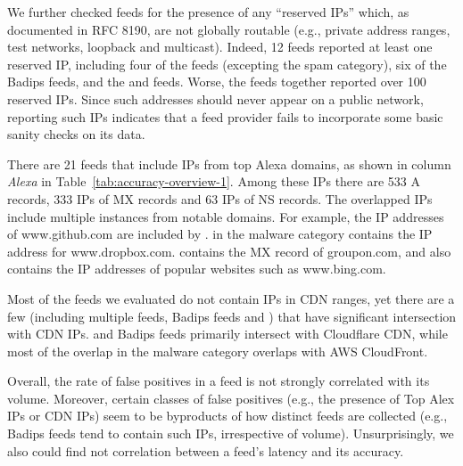 We further checked feeds for the presence of any ``reserved IPs''
which, as documented in RFC 8190, are not globally routable (e.g., private
address ranges, test networks, loopback and multicast).  Indeed,
12 feeds reported at least one reserved IP, including four of the
{\feedetiprep} feeds (excepting the spam category), six of the Badips
feeds, and the {\feedFBAdmin} and {\feeddshield} feeds. Worse, the
{\feedetiprep} feeds together reported over 100 reserved IPs. Since
such addresses should never appear on a public network,
reporting such IPs indicates that a feed provider fails to
incorporate some basic sanity checks on its data.

There are 21 feeds that include IPs from top Alexa domains, as shown
in column \textit{Alexa} in Table~\ref{tab:accuracy-overview-1}. Among
these IPs there are 533 A records, 333 IPs of MX records and 63 IPs of
NS records.  The overlapped IPs include multiple instances from
notable domains. For example, the IP addresses of www.github.com are
included by {\feedmalcode}.  {\feedetiprep} in the malware category
contains the IP address for www.dropbox.com.  {\feedalienvault}
contains the MX record of groupon.com, and {\feedbadipssh} also
contains the IP addresses of popular websites such as www.bing.com.

Most of the feeds we evaluated do not contain IPs in CDN ranges, yet
there are a few (including multiple {\feedetiprep} feeds, Badips feeds
and {\feedalienvault}) that have significant intersection with CDN
IPs. {\feedalienvault} and Badips feeds primarily intersect with
Cloudflare CDN, while most of the overlap in the {\feedetiprep} malware
category overlaps with AWS CloudFront.

Overall, the rate of false positives in a feed is not strongly
correlated with its volume.  Moreover, certain classes of false
positives (e.g., the presence of Top Alex IPs or CDN IPs) seem to
be byproducts of how distinct feeds are collected (e.g., Badips
feeds tend to contain such IPs, irrespective of volume).
Unsurprisingly, we also could find not correlation between a feed's
latency and its accuracy.



